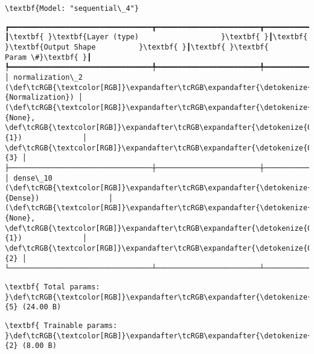 \documentclass[11pt]{article}
\begin{document}
    
    \begin{Verbatim}[commandchars=\\\{\}]
\textbf{Model: "sequential\_4"}

    \end{Verbatim}

    
    
    \begin{Verbatim}[commandchars=\\\{\}]
┏━━━━━━━━━━━━━━━━━━━━━━━━━━━━━━━━━┳━━━━━━━━━━━━━━━━━━━━━━━━┳━━━━━━━━━━━━━━━┓
┃\textbf{ }\textbf{Layer (type)                   }\textbf{ }┃\textbf{ }\textbf{Output Shape          }\textbf{ }┃\textbf{ }\textbf{      Param \#}\textbf{ }┃
┡━━━━━━━━━━━━━━━━━━━━━━━━━━━━━━━━━╇━━━━━━━━━━━━━━━━━━━━━━━━╇━━━━━━━━━━━━━━━┩
│ normalization\_2 (\def\tcRGB{\textcolor[RGB]}\expandafter\tcRGB\expandafter{\detokenize{0,135,255}}{Normalization}) │ (\def\tcRGB{\textcolor[RGB]}\expandafter\tcRGB\expandafter{\detokenize{0,215,255}}{None}, \def\tcRGB{\textcolor[RGB]}\expandafter\tcRGB\expandafter{\detokenize{0,175,0}}{1})              │             \def\tcRGB{\textcolor[RGB]}\expandafter\tcRGB\expandafter{\detokenize{0,175,0}}{3} │
├─────────────────────────────────┼────────────────────────┼───────────────┤
│ dense\_10 (\def\tcRGB{\textcolor[RGB]}\expandafter\tcRGB\expandafter{\detokenize{0,135,255}}{Dense})                │ (\def\tcRGB{\textcolor[RGB]}\expandafter\tcRGB\expandafter{\detokenize{0,215,255}}{None}, \def\tcRGB{\textcolor[RGB]}\expandafter\tcRGB\expandafter{\detokenize{0,175,0}}{1})              │             \def\tcRGB{\textcolor[RGB]}\expandafter\tcRGB\expandafter{\detokenize{0,175,0}}{2} │
└─────────────────────────────────┴────────────────────────┴───────────────┘

    \end{Verbatim}

    
    
    \begin{Verbatim}[commandchars=\\\{\}]
\textbf{ Total params: }\def\tcRGB{\textcolor[RGB]}\expandafter\tcRGB\expandafter{\detokenize{0,175,0}}{5} (24.00 B)

    \end{Verbatim}

    
    
    \begin{Verbatim}[commandchars=\\\{\}]
\textbf{ Trainable params: }\def\tcRGB{\textcolor[RGB]}\expandafter\tcRGB\expandafter{\detokenize{0,175,0}}{2} (8.00 B)

    \end{Verbatim}
\end{document}
